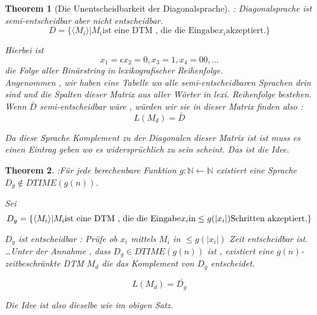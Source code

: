 \documentclass{article}
\newtheorem{theorem}{Theorem}
\begin{document}
  	\begin{theorem}[Die Unentscheidbarkeit der Diagonalsprache] \label{UderDS}: Diagonalsprache ist semi-entscheidbar aber nicht entscheidbar.
  		\[ 
  			D = \{ \langle M_i \rangle | M_i  \textrm{ist eine DTM , die die Eingabe} x_i \textrm{akzeptiert.} \} 
		\]

  		Hierbei ist 
  		\[ 
  			x_1 = \epsilon x_2=0 , x_3=1 , x_4=00 , \dots 
		\] 
		die Folge aller Binärstring in lexikografischer Reihenfolge.\\

		Angenommen , wir haben eine Tabelle wo alle semi-entscheidbaren Sprachen drin sind und die Spalten dieser Matrix aus aller Wörter in lexi. Reihenfolge bestehen. Wenn $\bar{D}$ semi-entscheidbar wäre , würden wir sie in dieser Matrix finden also : 
		\[
			L(M_d) = \bar{D} 
		\]

		Da diese Sprache Komplement zu der Diagonalen dieser Matrix ist ist muss es einen Eintrag geben wo es widersprüchlich zu sein scheint. Das ist die Idee.

	\end{theorem}

	\begin{theorem}
		:Für jede berechenbare Funktion $g \colon \mathbb{N} \leftarrow \mathbb{N} $ existiert eine Sprache $D_g \notin DTIME(g(n))$.

		Sei\\
		\[
			D_g = \{ \langle M_i \rangle | M_i \textrm{ist eine DTM , die die Eingabe} x_i \\ \textrm{in} \leq g(|x_i|) \textrm{Schritten akzeptiert.} \}
		\]

		$D_g$ ist entscheidbar : Prüfe ob $x_i$ mittels $M_i$ in $ \leq g(|x_i|)$ Zeit entscheidbar ist.\\

		\dots Unter der Annahme , dass $D_g \in DTIME(g(n))$ ist , existiert eine $g(n)$-zeitbeschränkte DTM $M_d$ die das Komplement von $D_g$ entscheidet.

		\[
			L(M_d) = \bar{D_g} 
		\]

		Die Idee ist also dieselbe wie im obigen Satz.
	\end{theorem}
\end{document}
